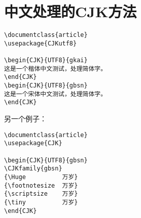 \section{中文处理的CJK方法}
\label{sec:zhCJK}

\begin{verbatim}
\documentclass{article}
\usepackage{CJKutf8}

\begin{CJK}{UTF8}{gkai}
这是一个楷体中文测试，处理简体字。
\end{CJK}
\begin{CJK}{UTF8}{gbsn}
这是一个宋体中文测试，处理简体字。
\end{CJK}

\end{verbatim}

另一个例子：
\begin{verbatim}
\documentclass{article}
\usepackage{CJK}

\begin{CJK}{UTF8}{gbsn}
\CJKfamily{gbsn}
{\Huge          万岁}
{\footnotesize  万岁}
{\scriptsize    万岁}
{\tiny          万岁}
\end{CJK}

\end{verbatim}


